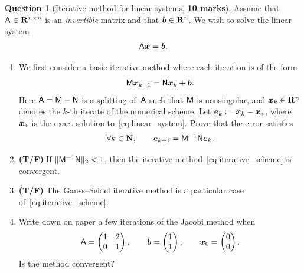 \documentclass[10pt]{article}
\theoremstyle{definition}
\newtheorem{question}{Question}
\theoremstyle{remark}
\theoremstyle{plain}%
\begin{document}
\newpage
\begin{question}
    [Iterative method for linear systems, \textbf{10 marks}]
    Assume that $\mathsf A \in \mathbf R^{n \times n}$ is an \emph{invertible} matrix and that $\mathbf{\boldsymbol{b}} \in \mathbf R^n$.
    We wish to solve the linear system
    \begin{equation}
        \label{eq:linear_system}
        \mathsf A \mathbf{\boldsymbol{x}} = \mathbf{\boldsymbol{b}}.
    \end{equation}

    \begin{enumerate}
        \itemsep0pt
        \item
            We first consider a basic iterative method where each iteration is of the form
            \begin{equation}
                \label{eq:iterative_scheme}
                \mathsf M \mathbf{\boldsymbol{x}}_{k+1} = \mathsf N \mathbf{\boldsymbol{x}}_k + \mathbf{\boldsymbol{b}}.
            \end{equation}
            Here $\mathsf A = \mathsf M - \mathsf N$ is a splitting of~$\mathsf A$ such that $\mathsf M$ is nonsingular,
            and $\mathbf{\boldsymbol{x}}_k \in \mathbf R^n$ denotes the $k$-th iterate of the numerical scheme.
            Let $\mathbf{\boldsymbol{e}}_k := \mathbf{\boldsymbol{x}}_k - \mathbf{\boldsymbol{x}}_*$,
            where $\mathbf{\boldsymbol{x}}_*$ is the exact solution to~\eqref{eq:linear_system}.
            Prove that the error satisfies
            \[
                \forall k \in \mathbf N, \qquad
                \mathbf{\boldsymbol{e}}_{k+1} = \mathsf M^{-1} \mathsf N \mathbf{\boldsymbol{e}}_k.
            \]
            \vspace{2cm}

        \item
            \textbf{(T/F)}
            If $\lVert \mathsf M^{-1} \mathsf N \rVert_2 < 1$,
            then the iterative method~\eqref{eq:iterative_scheme} is convergent.

        \item
            \textbf{(T/F)}
            The Gauss--Seidel iterative method
            is a particular case of~\eqref{eq:iterative_scheme}.

        \item
            Write down on paper a few iterations of the Jacobi method when
            \[
                \mathsf A =
                \begin{pmatrix}
                    1 & 2 \\
                    0 & 1
                \end{pmatrix},
                \qquad
                \mathbf{\boldsymbol{b}}
                =
                \begin{pmatrix}
                    1 \\
                    1
                \end{pmatrix},
                \qquad
                \mathbf{\boldsymbol{x}}_0 =
                \begin{pmatrix}
                    0 \\
                    0
                \end{pmatrix}.
            \]
            Is the method convergent?
            \vspace{2.5cm}


\end{enumerate}
\end{question}
\end{document}
